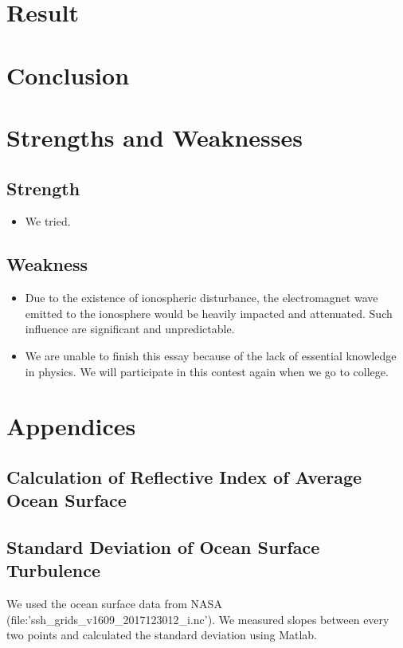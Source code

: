 \documentclass{article}
\begin{document}
\section{Result}
\section{Conclusion}
\section{Strengths and Weaknesses}
\subsection{Strength}
\begin{itemize}
    \item We tried.
\end{itemize}
\subsection{Weakness}
\begin{itemize}
    \item Due to the existence of ionospheric disturbance, the electromagnet wave emitted to the ionosphere would be heavily impacted and attenuated. Such influence are significant and unpredictable. 
    \item We are unable to finish this essay because of the lack of essential knowledge in physics. We will participate in this contest again when we go to college.
\end{itemize}
\section{Appendices}
\subsection{Calculation of Reflective Index of Average Ocean Surface} \label{}

\subsection{Standard Deviation of Ocean Surface Turbulence} \label{sd}
We used the ocean surface data from NASA (file:'ssh\_grids\_v1609\_2017123012\_i.nc'). We measured slopes between every two points and calculated the standard deviation using Matlab.
\newpage

\appendix
\end{document}
